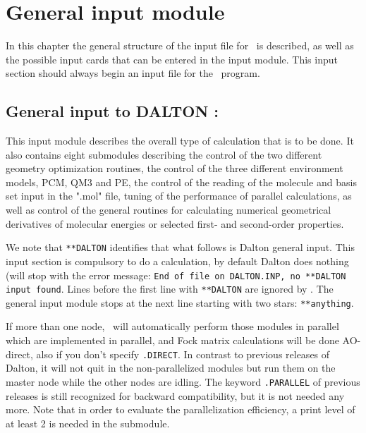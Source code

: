 \chapter{General input module}\label{ch:general}

In this chapter the general structure of the input file for \dalton\
is described, as well as the possible input cards that can be entered in
the \Sec{*DALTON} input module. This input section should always begin an
input file for the \dalton\ program.

\section{General input to DALTON : }\label{sec:general}

This input module describes the overall type of calculation that is to
be done. It also contains eight submodules describing
the control of the two different geometry optimization routines,
the control of the three different environment models, PCM, QM3 and PE,
the control of the reading of the molecule and basis set input
  in the ".mol" file,
tuning of the performance of parallel calculations,
as well as control of the general routines for calculating
numerical geometrical derivatives of molecular energies or selected
first- and second-order properties.

We note that \verb|**DALTON| identifies that what follows is Dalton general input.
This input section is compulsory to do a calculation, by default Dalton does nothing
(will stop with the error message:
{\tt End of file on DALTON.INP, no **DALTON input found}.
Lines before the first line with \verb|**DALTON| are ignored by \dalton .
The general input module stops at the next line starting with two stars: \verb|**anything|.

If more than one node, \dalton\ will automatically perform those modules in parallel
which are implemented in parallel, and Fock matrix calculations will be done AO-direct,
also if you don't specify \verb|.DIRECT|.
In contrast to previous releases of Dalton, it will not quit in the non-parallelized modules
but run them on the master node while the other nodes are idling.
The keyword \verb|.PARALLEL| of previous releases is still recognized for backward compatibility,
but it is not needed any more.
Note that in order to evaluate the parallelization efficiency,
a print level of at least 2 is needed in the \Sec{PARALLEL} submodule.

